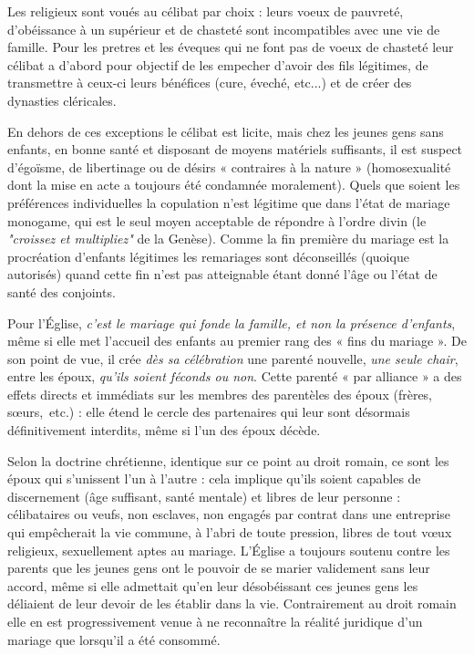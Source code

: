 Les religieux sont voués au célibat par choix : leurs voeux de pauvreté, d'obéissance à un supérieur et de chasteté sont incompatibles avec une vie de famille. Pour les pretres et les éveques qui ne font pas de voeux de chasteté leur célibat a d'abord pour objectif de les empecher d'avoir des fils légitimes, de transmettre à ceux-ci leurs bénéfices (cure, éveché, etc...) et de créer des dynasties cléricales. 
 
En dehors de ces exceptions le célibat est licite, mais chez les jeunes gens sans enfants, en bonne santé et disposant de moyens matériels suffisants, il est suspect d'égoïsme, de libertinage ou de désirs « contraires à la nature » (homosexualité dont la mise en acte a toujours été condamnée moralement). Quels que soient les préférences individuelles la copulation n'est légitime que dans l'état de mariage monogame, qui est le seul moyen acceptable de répondre à l'ordre divin (le \emph{"croissez et multipliez"} de la Genèse).  Comme la fin première du mariage est la procréation d'enfants légitimes les remariages sont déconseillés (quoique autorisés) quand cette fin n'est pas atteignable étant donné l'âge ou l'état de santé des conjoints. 
 
 

 Pour l'Église, \emph{c'est le mariage qui fonde la famille, et non la présence d'enfants}, même si elle met l'accueil des enfants au premier rang des « fins du mariage ». De son point de vue, il crée \emph{dès sa célébration} une parenté nouvelle, \emph{une seule chair}, entre les époux, \emph{qu'ils soient féconds ou non}. Cette parenté « par alliance » a des effets directs et immédiats sur les membres des parentèles des époux (frères, sœurs,~etc.) : elle étend le cercle des partenaires qui leur sont désormais définitivement interdits, même si l'un des époux décède.

 Selon la doctrine chrétienne, identique sur ce point au droit romain, ce sont les époux qui s'unissent l'un à l'autre : cela implique qu'ils soient capables de discernement (âge suffisant, santé mentale) et libres de leur personne : célibataires ou veufs, non esclaves, non engagés par contrat dans une entreprise qui empêcherait la vie commune, à l'abri de toute pression, libres de tout vœux religieux, sexuellement aptes au mariage. L'Église a toujours soutenu contre les parents que les jeunes gens ont le pouvoir de se marier validement sans leur accord, même si elle admettait qu'en leur désobéissant ces jeunes gens les déliaient de leur devoir de les établir dans la vie. Contrairement au droit romain elle en est progressivement venue à ne reconnaître la réalité juridique d'un mariage que lorsqu'il a été consommé. 
 
